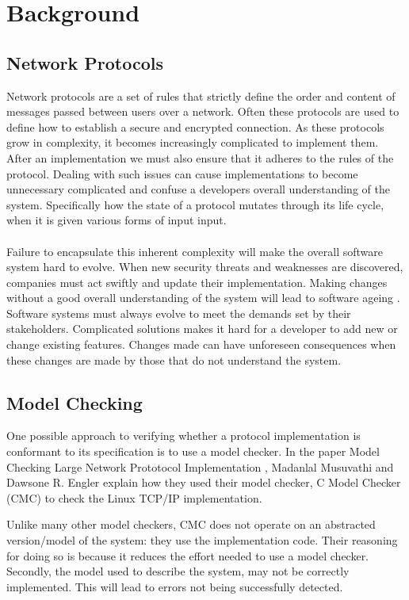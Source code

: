\section{Background}

\subsection{Network Protocols}
Network protocols are a set of rules that strictly define the order and content of messages passed between users over a network. Often these protocols are used to define how to establish a secure and encrypted connection. As these protocols grow in complexity, it becomes increasingly complicated to implement them. After an implementation we must also ensure that it adheres to the rules of the protocol. Dealing with such issues can cause implementations to become unnecessary complicated and confuse a developers overall understanding of the system. Specifically how the state of a protocol mutates through its life cycle, when it is given various forms of input input.
\\\\
Failure to encapsulate this inherent complexity will make the overall software system hard to evolve. When new security threats and weaknesses are discovered, companies must act swiftly and update their implementation. Making changes without a good overall understanding of the system will lead to software ageing \cite{parnas1994software}. Software systems must always evolve to meet the demands set by their stakeholders. Complicated solutions makes it hard for a developer to add new or change existing features. Changes made can have unforeseen consequences when these changes are made by those that do not understand the system.

\subsection{Model Checking}
One possible approach to verifying whether a protocol implementation is conformant to its specification is to use a model checker. In the paper Model Checking Large Network Prototocol Implementation \cite{musuvathi2004model}, Madanlal Musuvathi and Dawsone R. Engler explain how they used their model checker, C Model Checker (CMC) \cite{musuvathi2002cmc} to check the Linux TCP/IP implementation. 

Unlike many other model checkers, CMC does not operate on an abstracted version/model of the system: they use the implementation code. Their reasoning for doing so is because it reduces the effort needed to use a model checker. Secondly, the model used to describe the system, may not be correctly implemented. This will lead to errors not being successfully detected. 

